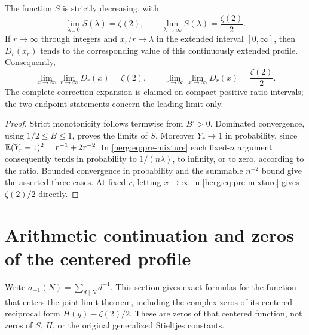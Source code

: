 \begin{corollary}
\label{herg:cor:ratios}
The function $S$ is strictly decreasing, with
\[
 \lim_{\lambda\downarrow0}S(\lambda)=\zeta(2),\qquad
 \lim_{\lambda\to\infty}S(\lambda)=\frac{\zeta(2)}2.
\]
If $r\to\infty$ through integers and $x_r/r\to\lambda$ in the
extended interval $[0,\infty]$, then $D_r(x_r)$ tends to the
corresponding value of this continuously extended profile.
Consequently,
\[
 \lim_{x\to\infty}\lim_{r\to\infty}D_r(x)=\zeta(2),\qquad
 \lim_{r\to\infty}\lim_{x\to\infty}D_r(x)=\frac{\zeta(2)}2.
\]
The complete correction expansion is claimed on compact positive
ratio intervals; the two endpoint statements concern the leading
limit only.
\end{corollary}
\begin{proof}
Strict monotonicity follows termwise from $B'>0$. Dominated
convergence, using $1/2\leq B\leq1$, proves the limits of $S$.
Moreover $Y_r\to1$ in probability, since
$\mathbb E(Y_r-1)^2=r^{-1}+2r^{-2}$. In \eqref{herg:eq:pre-mixture}
each fixed-$n$ argument consequently tends in probability to
$1/(n\lambda)$, to infinity, or to zero, according to the ratio.
Bounded convergence in probability and the summable $n^{-2}$ bound
give the asserted three cases. At fixed $r$, letting $x\to\infty$
in \eqref{herg:eq:pre-mixture} gives $\zeta(2)/2$ directly.
\end{proof}

\section{Arithmetic continuation and zeros of the centered profile}
\label{herg:sec:profile}

Write $\sigma_{-1}(N)=\sum_{d\mid N}d^{-1}$. This section gives
exact formulas for the function that enters the joint-limit theorem,
including the complex zeros of its centered reciprocal form
$H(y)-\zeta(2)/2$. These are zeros of that centered function, not
zeros of $S$, $H$, or the original generalized Stieltjes constants.

